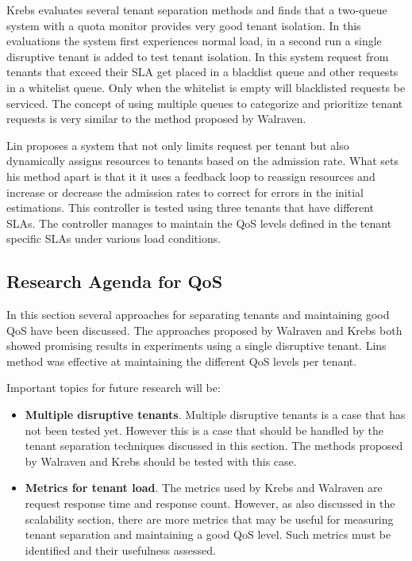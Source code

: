 Krebs evaluates several tenant separation methods and finds that a two-queue system with a quota monitor provides very good tenant isolation.
In this evaluations the system first experiences normal load, in a second run a single disruptive tenant is added to test tenant isolation.
In this system request from tenants that exceed their \ac{SLA} get placed in a blacklist queue and other requests in a whitelist queue. 
Only when the whitelist is empty will blacklisted requests be serviced.
The concept of using multiple queues to categorize and prioritize tenant requests is very similar to the method proposed by Walraven.

Lin proposes a system that not only limits request per tenant but also dynamically assigns resources to tenants based on the admission rate.
What sets his method apart is that it it uses a feedback loop to reassign resources and increase or decrease the admission rates to correct for errors in the initial estimations.
This controller is tested using three tenants that have different \acp{SLA}. 
The controller manages to maintain the \ac{QoS} levels defined in the tenant specific \acp{SLA} under various load conditions.

\subsection{Research Agenda for \ac{QoS}}\label{sec:qos_agenda}
In this section several approaches for separating tenants and maintaining good \ac{QoS} have been discussed.
The approaches proposed by Walraven and Krebs both showed promising results in experiments using a single disruptive tenant.
Lins method was effective at maintaining the different \ac{QoS} levels per tenant.

Important topics for future research will be:
\begin{itemize}
	\item \textbf{Multiple disruptive tenants}.
		Multiple disruptive tenants is a case that has not been tested yet. 
		However this is a case that should be handled by the tenant separation techniques discussed in this section.
		The methods proposed by Walraven and Krebs should be tested with this case.
	\item \textbf{Metrics for tenant load}.
		The metrics used by Krebs and Walraven are request response time and response count. 
		However, as also discussed in the scalability section, there are more metrics that may be useful for measuring tenant separation and maintaining a good \ac{QoS} level. Such metrics must be identified and their usefulness assessed.
\end{itemize}

